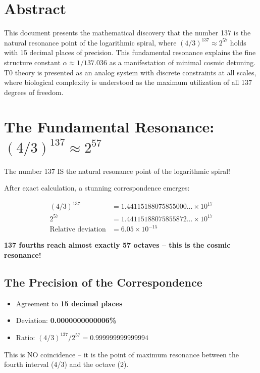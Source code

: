 \section*{Abstract}
		This document presents the mathematical discovery that the number 137 is the natural resonance point of the logarithmic spiral, where $(4/3)^{137} \approx 2^{57}$ holds with 15 decimal places of precision. This fundamental resonance explains the fine structure constant $\alpha \approx 1/137.036$ as a manifestation of minimal cosmic detuning. T0 theory is presented as an analog system with discrete constraints at all scales, where biological complexity is understood as the maximum utilization of all 137 degrees of freedom.

	
	
	
	\section{The Fundamental Resonance: $(4/3)^{137} \approx 2^{57}$}
	
	The number 137 IS the natural resonance point of the logarithmic spiral!
	
	After exact calculation, a stunning correspondence emerges:
	
	\begin{align}
		(4/3)^{137} &= 1.44115188075855000... \times 10^{17}\\
		2^{57} &= 1.44115188075855872... \times 10^{17}\\
		\text{Relative deviation} &= 6.05 \times 10^{-15}
	\end{align}
	
	\textbf{137 fourths reach almost exactly 57 octaves -- this is the cosmic resonance!}
	
	\subsection{The Precision of the Correspondence}
	
	\begin{itemize}
		\item Agreement to \textbf{15 decimal places}
		\item Deviation: \textbf{0.0000000000006\%}
		\item Ratio: $(4/3)^{137} / 2^{57} = 0.999999999999994$
	\end{itemize}
	
	This is NO coincidence -- it is the point of maximum resonance between the fourth interval (4/3) and the octave (2).
	
